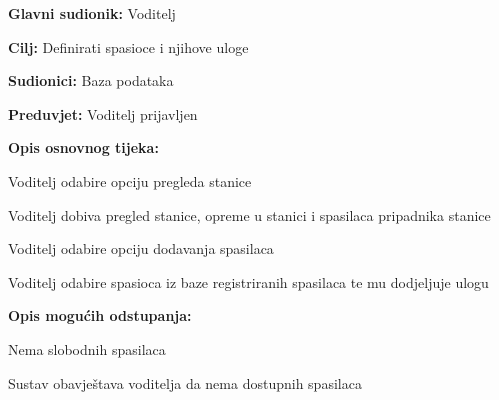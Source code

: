 					\noindent {}
					\begin{packed_item}
	
						\item \textbf{Glavni sudionik: }\text Voditelj
						\item  \textbf{Cilj:} \text Definirati spasioce i njihove uloge
						\item  \textbf{Sudionici:} \text Baza podataka
						\item  \textbf{Preduvjet:} \text Voditelj prijavljen
						\item  \textbf{Opis osnovnog tijeka:}
						
						\item[] \begin{packed_enum}
	
							\item \text Voditelj odabire opciju pregleda stanice
							\item \text Voditelj dobiva pregled stanice, opreme u stanici i spasilaca pripadnika stanice
							\item \text Voditelj odabire opciju dodavanja spasilaca
							\item \text Voditelj odabire spasioca iz baze registriranih spasilaca te mu dodjeljuje ulogu
					
						\end{packed_enum}

						\item  \textbf{Opis mogućih odstupanja:}
						
						\item[] \begin{packed_item}
	
							\item[4.a] \text Nema slobodnih spasilaca
							\item[] \begin{packed_item}
								
								\item \text Sustav obavještava voditelja da nema dostupnih spasilaca
								
							\end{packed_item}
							
						\end{packed_item}
						
					\end{packed_item}

